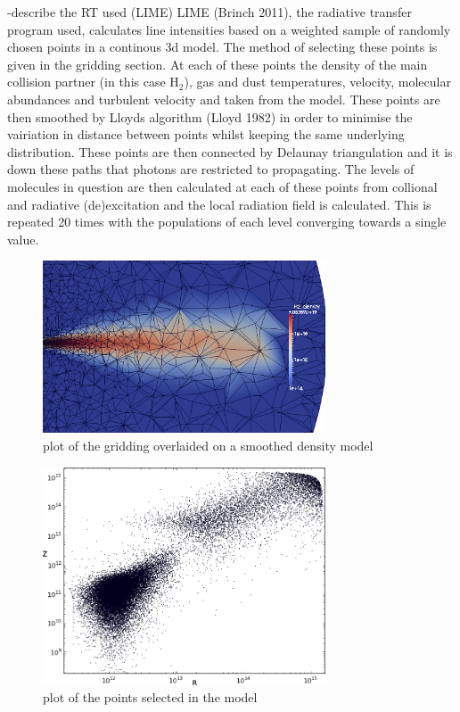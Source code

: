 \documentclass[useAMS,usenatbib]{mn2e}
\begin{document}
-describe the RT used (LIME) 
LIME (Brinch 2011), the radiative transfer program used, calculates line intensities based on a weighted sample of randomly chosen points in a continous 3d model. The method of selecting these points is given in the gridding section. At each of these points the density of the main collision partner (in this case H$_2$), gas and dust temperatures, velocity, molecular abundances and turbulent velocity and taken from the model. These points are then smoothed by Lloyds algorithm (Lloyd 1982) in order to minimise the vairiation in distance between points whilst keeping the same underlying distribution. These points are then connected by Delaunay triangulation and it is down these paths that photons are restricted to propagating. The levels of molecules in question are then  calculated at each of these points from collional and radiative (de)excitation and the local radiation field is calculated. This is repeated 20 times with the populations of each level converging towards a single value. \newline


\begin{figure}
 \includegraphics[width=84mm]{Figures/model/Lime_grid3.png}

 \caption{plot of the gridding overlaided on a smoothed density model}
\end{figure}

\begin{figure}
 \includegraphics[width=84mm]{Figures/model/lime_points_rz2.png}

 \caption{plot of the points selected in the model}
\end{figure}
\end{document}
